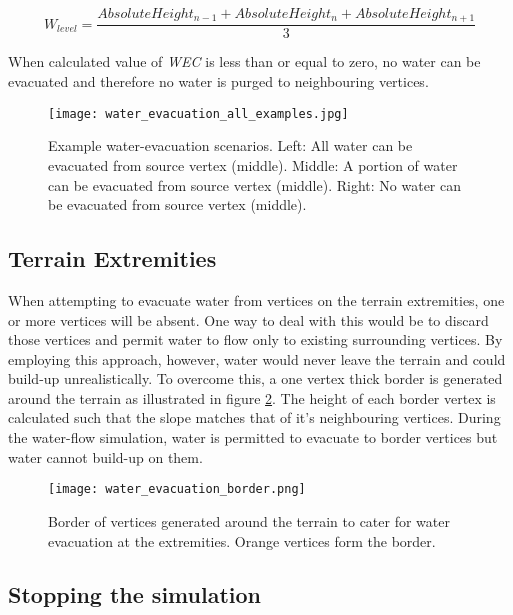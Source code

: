 \begin{equation} \label{eq:water_level_calc}
	W_{level} = \frac{AbsoluteHeight_{n-1} + AbsoluteHeight_{n} + AbsoluteHeight_{n+1}}{3}
\end{equation}

When calculated value of \textit{WEC} is less than or equal to zero, no water can be evacuated and therefore no water is purged to neighbouring vertices.

\begin{figure}
\center
	\texttt{[image: water\_evacuation\_all\_examples.jpg]}
	\caption{ Example water-evacuation scenarios. Left: All water can be evacuated from source vertex (middle). Middle: A portion of water can be evacuated from source vertex (middle). Right: No water can be evacuated from source vertex (middle).}
	\label{fig:evacuation_scenarios}
\end{figure}

\subsection{Terrain Extremities} \label{subsec:terrain_extremeties}

When attempting to evacuate water from vertices on the terrain extremities, one or more vertices will be absent. One way to deal with this would be to discard those vertices and permit water to flow only to existing surrounding vertices. By employing this approach, however, water would never leave the terrain and could build-up unrealistically. To overcome this, a one vertex thick border is generated around the terrain as illustrated in figure \ref{fig:evacuation_border}. The height of each border vertex is calculated such that the slope matches that of it's neighbouring vertices. During the water-flow simulation, water is permitted to evacuate to border vertices but water cannot build-up on them.

\begin{figure}
\center
	\texttt{[image: water\_evacuation\_border.png]}
	\caption{ Border of vertices generated around the terrain to cater for water evacuation at the extremities. Orange vertices form the border. }
	\label{fig:evacuation_border}
\end{figure}

\subsection{Stopping the simulation} \label{subsec:stopping_water_flow}

